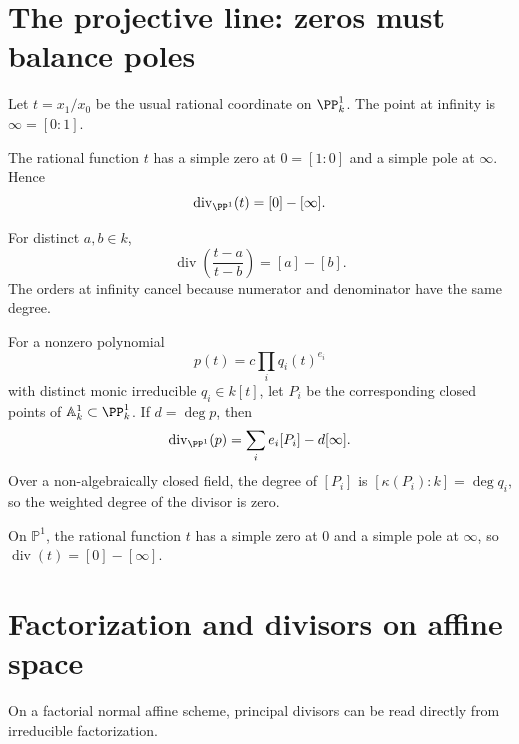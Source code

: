\section{The projective line: zeros must balance poles}
Let \(t=x_1/x_0\) be the usual rational coordinate on \(\PP^1_k\).  The point at infinity is \(\infty=[0:1]\).

\begin{example}\label{ex:vi39-p1-coordinate}
The rational function \(t\) has a simple zero at \(0=[1:0]\) and a simple pole at \(\infty\).  Hence
\[
 \operatorname{div}_{\PP^1}(t)=[0]-[\infty].
\]
\end{example}



\begin{example}\label{ex:vi39-p1-ratio}
For distinct \(a,b\in k\),
\[
 \operatorname{div}\!\left(\frac{t-a}{t-b}\right)=[a]-[b].
\]
The orders at infinity cancel because numerator and denominator have the same degree.
\end{example}

\begin{example}\label{ex:vi39-polynomial-projective}
For a nonzero polynomial
\[
 p(t)=c\prod_i q_i(t)^{e_i}
\]
with distinct monic irreducible \(q_i\in k[t]\), let \(P_i\) be the corresponding closed points of \(\mathbb{A}^1_k\subset\PP^1_k\).  If \(d=\deg p\), then
\[
 \operatorname{div}_{\PP^1}(p)=\sum_i e_i[P_i]-d[\infty].
\]
Over a non-algebraically closed field, the degree of \([P_i]\) is \([\kappa(P_i):k]=\deg q_i\), so the weighted degree of the divisor is zero.
\end{example}

\begin{example}\label{ex:vi39-expand-02}
On $\mathbb P^1$, the rational function $t$ has a simple zero at $0$ and a simple pole at $\infty$, so $\operatorname{div}(t)=[0]-[\infty]$.
\end{example}
\section{Factorization and divisors on affine space}
On a factorial normal affine scheme, principal divisors can be read directly from irreducible factorization.

